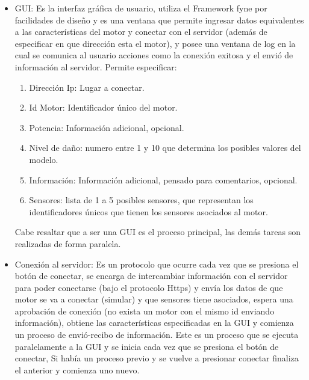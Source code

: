 \begin{itemize}
    \item GUI: Es la interfaz gráfica de usuario, utiliza el Framework fyne por
        facilidades
        de diseño y es una ventana que permite ingresar datos equivalentes
        a las características del motor y conectar con el servidor (además de
        especificar en que dirección esta el motor), y posee una ventana de
        log en la cual se comunica al usuario acciones como la conexión exitosa y
        el envió de información al servidor. Permite especificar:
        \begin{enumerate}
            \item Dirección Ip: Lugar a conectar.
            \item Id Motor: Identificador único del motor.
            \item Potencia: Información adicional, opcional.
            \item Nivel de daño: numero entre 1 y 10 que determina los posibles
                valores del modelo.
            \item Información: Información adicional, pensado para comentarios,
                opcional.
            \item Sensores: lista de 1 a 5 posibles sensores, que representan
                los identificadores únicos que tienen los sensores asociados
                al motor.
        \end{enumerate}

        Cabe resaltar que a ser una GUI es el proceso principal, las demás
        tareas son realizadas de forma paralela.

    \item Conexión al servidor: Es un protocolo que ocurre cada vez que se presiona
        el botón de conectar, se encarga de intercambiar información con el servidor
        para poder conectarse (bajo el protocolo Https) y envía los datos de
        que motor se va a conectar (simular) y que sensores tiene asociados, espera
        una aprobación de conexión (no exista un motor con el mismo id enviando
        información), obtiene las características especificadas en la GUI y
        comienza un proceso de envió-recibo de información.
        Este es un proceso
        que se ejecuta paralelamente a la GUI y se inicia cada vez que se
        presiona el botón de conectar, Si había un proceso previo y se vuelve a
        presionar conectar finaliza el anterior y comienza uno nuevo.


\end{itemize}

